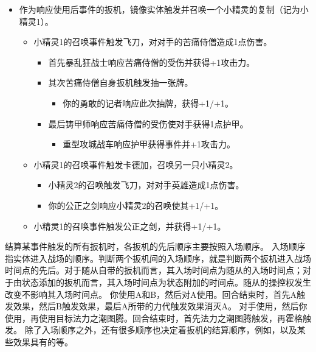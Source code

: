 \begin{itemize}
    \item 作为响应使用后事件的扳机，镜像实体触发并召唤一个小精灵的复制（记为小精灵1）。
    \begin{itemize}
        \item 小精灵1的召唤事件触发飞刀，对对手的苦痛侍僧造成1点伤害。
        \begin{itemize}
            \item 首先暴乱狂战士响应苦痛侍僧的受伤并获得+1攻击力。
            \item 其次苦痛侍僧自身扳机触发抽一张牌。
            \begin{itemize}
                \item 你的勇敢的记者响应此次抽牌，获得+1/+1。
            \end{itemize}
            \item 最后铸甲师响应苦痛侍僧的受伤使对手获得1点护甲。
            \begin{itemize}
                \item 重型攻城战车响应护甲获得事件并+1攻击力。
            \end{itemize}
        \end{itemize}
        \item 小精灵1的召唤事件触发卡德加，召唤另一只小精灵2。
        \begin{itemize}
            \item 小精灵2的召唤触发飞刀，对对手英雄造成1点伤害。
            \item 你的公正之剑响应小精灵2的召唤使其+1/+1。
        \end{itemize}
        \item 小精灵1的召唤事件触发公正之剑，并获得+1/+1。
    \end{itemize}
\end{itemize}


结算某事件触发的所有扳机时，各扳机的先后顺序主要按照入场顺序。
\notice 入场顺序指实体进入战场的顺序。判断两个扳机间的入场顺序，就是判断两个扳机进入战场时间点的先后。对于随从自带的扳机而言，其入场时间点为随从的入场时间点；对于由状态添加的扳机而言，其入场时间点为状态附加的时间点。随从的操控权发生改变不影响其入场时间点。
\example 你使用A和B，然后对A使用。回合结束时，首先A触发效果，然后B触发效果，最后A所带的力代触发效果消灭A。
\example 对手使用，然后你使用，再使用目标法力之潮图腾。回合结束时，首先法力之潮图腾触发，再霍格触发。
\notice 除了入场顺序之外，还有很多顺序也决定着扳机的结算顺序，例如，以及某些效果具有的等。



